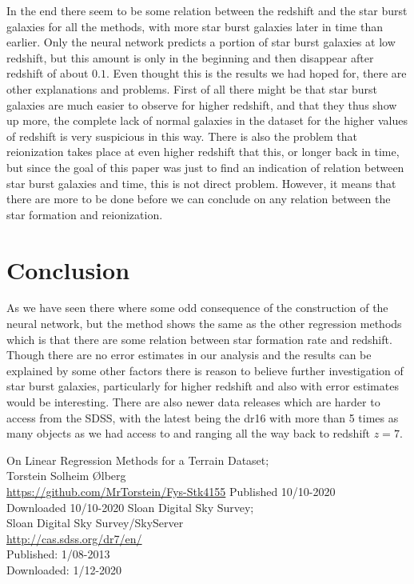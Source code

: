 \documentclass[11pt, A4paper, english]{article}
\begin{document}
\begin{multicols}{2}
In the end there seem to be some relation between the redshift and the star burst galaxies for all the methods, with more star burst galaxies later in time than earlier. Only the neural network predicts a portion of star burst galaxies at low redshift, but this amount is only in the beginning and then disappear after redshift of about $0.1$. Even thought this is the results we had hoped for, there are other explanations and problems. First of all there might be that star burst galaxies are much easier to observe for higher redshift, and that they thus show up more, the complete lack of normal galaxies in the dataset for the higher values of redshift is very suspicious in this way. There is also the problem that reionization takes place at even higher redshift that this, or longer back in time, but since the goal of this paper was just to find an indication of relation between star burst galaxies and time, this is not direct problem. However, it means that there are more to be done before we can conclude on any relation between the star formation and reionization.

		\section{Conclusion}
As we have seen there where some odd consequence of the construction of the neural network, but the method shows the same as the other regression methods which is that there are some relation between star formation rate and redshift. Though there are no error estimates in our analysis and the results can be explained by some other factors there is reason to believe further investigation of star burst galaxies, particularly for higher redshift and also with error estimates would be interesting. There are also newer data releases which are harder to access from the SDSS, with the latest being the dr16 with more than 5 times as many objects as we had access to and ranging all the way back to redshift $z = 7$.

		
		\begin{thebibliography}{9}
On Linear Regression Methods for a Terrain Dataset; \\
Torstein Solheim Ølberg \\
\url{https://github.com/MrTorstein/Fys-Stk4155}
Published 10/10-2020 \\
Downloaded 10/10-2020
Sloan Digital Sky Survey; \\
Sloan Digital Sky Survey/SkyServer \\
\url{http://cas.sdss.org/dr7/en/} \\
Published: 1/08-2013 \\
Downloaded: 1/12-2020
		\end{thebibliography}
	\end{multicols}
\end{document}
